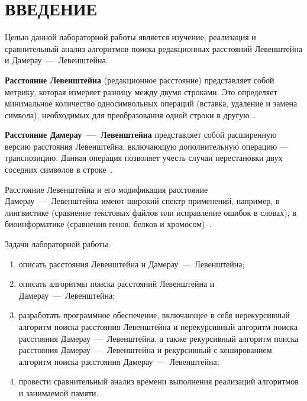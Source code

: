 \chapter*{ВВЕДЕНИЕ}

Целью данной лабораторной работы является изучение, реализация и сравнительный анализ алгоритмов поиска редакционных расстояний Левенштейна и Дамерау~---~Левенштейна.

\textbf{Расстояние Левенштейна} (редакционное расстояние) представляет собой метрику, которая измеряет разницу между двумя строками. Это определяет минимальное количество односимвольных операций (вставка, удаление и замена символа), необходимых для преобразования одной строки в другую~\cite{analysis-lev-damlev}.

\textbf{Расстояние Дамерау~---~Левенштейна} представляет собой расширенную версию расстояния Левенштейна, включающую дополнительную операцию --- транспозицию. Данная операция позволяет учесть случаи перестановки двух соседних символов в строке~\cite{analysis-lev-damlev}.

Расстояние Левенштейна и его модификация расстояние Дамерау~---~Левенштейна имеют широкий спектр применений, например, в лингвистике (сравнение текстовых файлов или исправление ошибок в словах), в биоинформатике (сравнения генов, белков и хромосом)~\cite{prog-impl-lev, analysis-lev-damlev}.


Задачи лабораторной работы:
\begin{enumerate}
	\item описать расстояния Левенштейна и Дамерау~---~Левенштейна;
	\item описать алгоритмы поиска расстояний Левенштейна и Дамерау~---~Левенштейна;
	\item разработать программное обеспечение, включающее в себя нерекурсивный алгоритм поиска расстояния Левенштейна и нерекурсивный алгоритм поиска расстояния Дамерау~---~Левенштейна, а также рекурсивный алгоритм поиска расстояния Дамерау~---~Левенштейна и рекурсивный с кешированием алгоритм поиска расстояния Дамерау~---~Левенштейна;
	\item провести сравнительный анализ времени выполнения реализаций алгоритмов и занимаемой памяти.
\end{enumerate}
